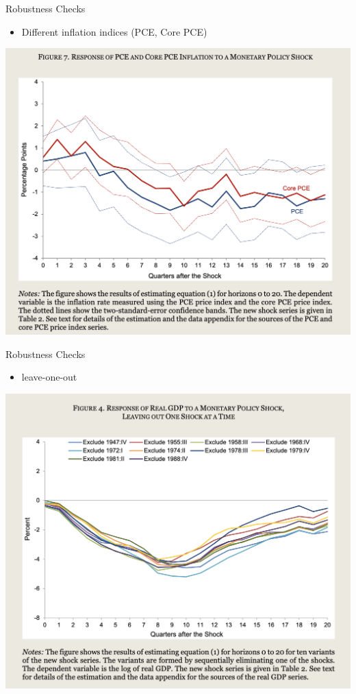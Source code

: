 \documentclass{beamer}
\begin{document}
\begin{frame}{Robustness Checks}
  \begin{itemize}
    \item Different inflation indices (PCE, Core PCE)
  \end{itemize}
    \centering
  \includegraphics[height=1\textheight]{Graphs/PCE Response.png}
\end{frame}
\begin{frame}{Robustness Checks}
    \begin{itemize}
        \item leave-one-out
    \end{itemize}
    \centering
    \includegraphics[height=1\textheight]{Graphs/RealGDPRobustness.png}
\end{frame}
\end{document}
